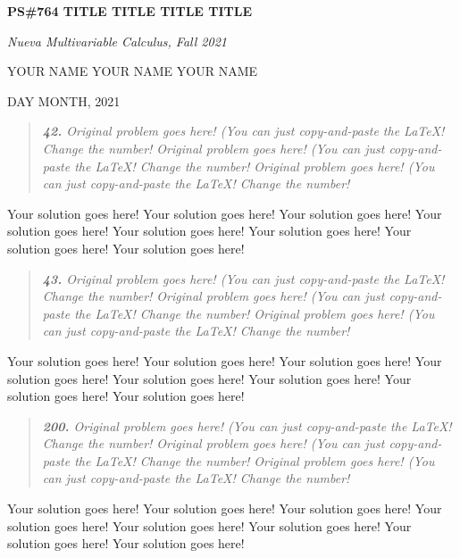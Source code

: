 \documentclass[11pt]{article}
\begin{document}
\begin{centering}
{\huge \bf PS\#764 TITLE TITLE TITLE TITLE} \smallskip

{\Large \em Nueva Multivariable Calculus, Fall 2021

YOUR NAME YOUR NAME YOUR NAME

DAY MONTH, 2021

}
\end{centering}

\vspace{3pc}
\begin{quote}\em {\bf 42.} Original problem goes here! (You can just copy-and-paste the \LaTeX ! Change the number! Original problem goes here! (You can just copy-and-paste the \LaTeX ! Change the number! Original problem goes here! (You can just copy-and-paste the \LaTeX ! Change the number! 
\end{quote}
Your solution goes here! Your solution goes here! Your solution goes here! Your solution goes here! Your solution goes here! Your solution goes here! Your solution goes here! Your solution goes here! 


\vspace{3pc}
\begin{quote}\em {\bf 43.} Original problem goes here! (You can just copy-and-paste the \LaTeX ! Change the number! Original problem goes here! (You can just copy-and-paste the \LaTeX ! Change the number! Original problem goes here! (You can just copy-and-paste the \LaTeX ! Change the number! 
\end{quote}
Your solution goes here! Your solution goes here! Your solution goes here! Your solution goes here! Your solution goes here! Your solution goes here! Your solution goes here! Your solution goes here! 

\vspace{3pc}
\begin{quote}\em {\bf 200.} Original problem goes here! (You can just copy-and-paste the \LaTeX ! Change the number! Original problem goes here! (You can just copy-and-paste the \LaTeX ! Change the number! Original problem goes here! (You can just copy-and-paste the \LaTeX ! Change the number! 
\end{quote}
Your solution goes here! Your solution goes here! Your solution goes here! Your solution goes here! Your solution goes here! Your solution goes here! Your solution goes here! Your solution goes here! 
\end{document}
